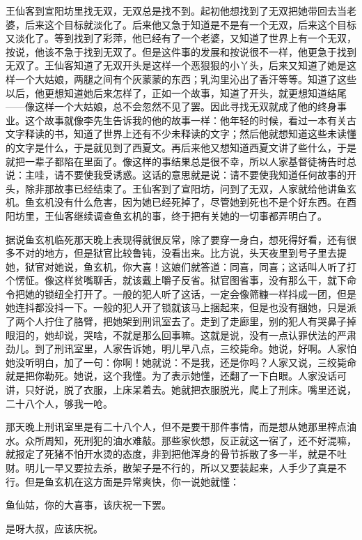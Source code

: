 王仙客到宣阳坊里找无双，无双总是找不到。起初他想找到了无双把她带回去当老婆，后来这个目标就淡化了。后来他又急于知道是不是有一个无双，后来这个目标又淡化了。等到找到了彩萍，他已经有了一个老婆，又知道了世界上有一个无双，按说，他该不急于找到无双了。但是这件事的发展和按说很不一样，他更急于找到无双了。王仙客知道了无双开头是这样一个恶狠狠的小丫头，后来又知道了她是这样一个大姑娘，两腿之间有个灰蒙蒙的东西；乳沟里沁出了香汗等等。知道了这些以后，他更想知道她后来怎样了，正如一个故事，知道了开头，就更想知道结尾——像这样一个大姑娘，总不会忽然不见了罢。因此寻找无双就成了他的终身事业。这个故事就像李先生告诉我的他的故事一样：他年轻的时候，看过一本有关古文字释读的书，知道了世界上还有不少未释读的文字；然后他就想知道这些未读懂的文字是什么，于是就见到了西夏文。再后来他又想知道西夏文讲了些什么，于是就把一辈子都陷在里面了。像这样的事结果总是很不幸，所以人家基督徒祷告时总说：主哇，请不要使我受诱惑。这话的意思就是说：请不要使我知道任何故事的开头，除非那故事已经结束了。王仙客到了宣阳坊，问到了无双，人家就给他讲鱼玄机。鱼玄机没有什么危害，因为她已经死掉了，尽管她到死也不是个好东西。在酉阳坊里，王仙客继续调查鱼玄机的事，终于把有关她的一切事都弄明白了。 

据说鱼玄机临死那天晚上表现得就很反常，除了要穿一身白，想死得好看，还有很多不对的地方，但是狱官比较鲁钝，没看出来。比方说，头天夜里到号子里去提她，狱官对她说，鱼玄机，你大喜！这娘们就答道：同喜，同喜；这话叫人听了打个愣怔。像这样贫嘴聊舌，就该戴上嚼子反省。狱官图省事，没有那么干，就下命令把她的锁纽全打开了。一般的犯人听了这话，一定会像筛糠一样抖成一团，但是她连抖都没抖一下。一般的犯人开了锁就该马上捆起来，但是也没有捆她，只是派了两个人拧住了胳臂，把她架到刑讯室去了。走到了走廊里，别的犯人有哭鼻子掉眼泪的，她却说，哭啥，不就是那么回事嘛。这就是说，没有一点认罪伏法的严肃劲儿。到了刑讯室里，人家告诉她，明儿早八点，三绞毙命。她说，好啊。人家怕她没听明白，加了一句：你啊！她就说：不是我，还是你吗？人家又说，三绞毙命就是把你勒死。她说，这个我懂。为了表示她懂，还翻了一下白眼。人家没话可讲，只好说，脱了衣服，上床呆着去。她就把衣服脱光，爬上了刑床。嘴里还说，二十八个人，够我一呛。 

那天晚上刑讯室里是有二十八个人，但不是要干那件事情，而是想从她那里榨点油水。众所周知，死刑犯的油水难敲。那些家伙想，反正就这一宿了，还不好混嘛，就报定了死猪不怕开水烫的态度，非到把他浑身的骨节拆散了多一半，就是不吐财。明儿一早又要拉去杀，散架子是不行的，所以又要装起来，人手少了真是不行。但是鱼玄机在这方面是异常爽快，你一说她就懂： 

鱼仙姑，你的大喜事，该庆祝一下罢。 

是呀大叔，应该庆祝。 

